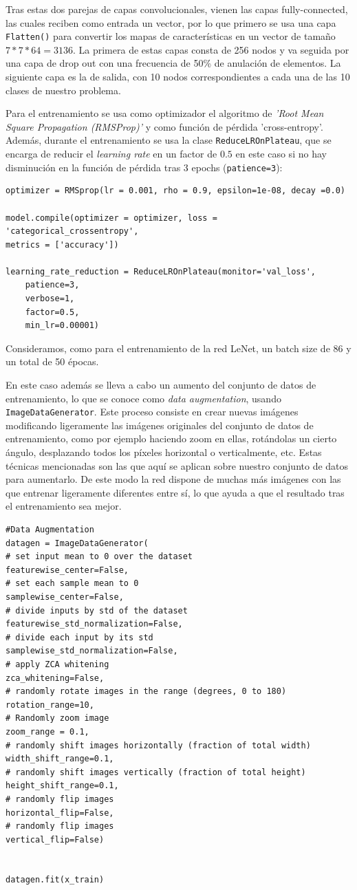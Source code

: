 \documentclass[a4paper,11pt]{article}
\begin{document}
Tras estas dos parejas de capas convolucionales, vienen las capas fully-connected, las cuales reciben como entrada un vector, por lo que primero se usa una capa \texttt{Flatten()} para convertir los mapas de características en un vector de tamaño $7*7*64=3136$.  La primera de estas capas consta de 256 nodos y va seguida por una capa de drop out con una frecuencia de 50\% de anulación de elementos. La siguiente capa es la de salida, con 10 nodos correspondientes a cada una de las 10 clases de nuestro problema. 

Para el entrenamiento se usa como optimizador el algoritmo de \textit{'Root Mean Square Propagation (RMSProp)'} y como función de pérdida 'cross-entropy'. Además, durante el entrenamiento se usa la clase \texttt{ReduceLROnPlateau}, que se encarga de reducir el \textit{learning rate} en un factor de $ 0.5$ en este caso si no hay disminución en la función de pérdida tras 3 epochs (\texttt{patience=3}):
\begin{verbatim}
optimizer = RMSprop(lr = 0.001, rho = 0.9, epsilon=1e-08, decay =0.0)

model.compile(optimizer = optimizer, loss = 'categorical_crossentropy', 
metrics = ['accuracy'])

learning_rate_reduction = ReduceLROnPlateau(monitor='val_loss', 
	patience=3, 
	verbose=1, 
	factor=0.5, 
	min_lr=0.00001)
\end{verbatim}

Consideramos, como para el entrenamiento de la red LeNet, un batch size de 86 y un total de 50 épocas. 

En este caso además se lleva a cabo un aumento del conjunto de datos de entrenamiento, lo que se conoce como \textit{data augmentation}, usando \texttt{ImageDataGenerator}. Este proceso consiste en crear nuevas imágenes modificando ligeramente las imágenes originales del conjunto de datos de entrenamiento, como por ejemplo haciendo zoom en ellas, rotándolas un cierto ángulo, desplazando todos los píxeles horizontal o verticalmente, etc. Estas técnicas mencionadas son las que  aquí se aplican sobre nuestro conjunto de datos para aumentarlo. De este modo la red dispone de muchas más imágenes con las que entrenar ligeramente diferentes entre sí, lo que ayuda a que el resultado tras el entrenamiento sea mejor. 
\begin{verbatim}
#Data Augmentation
datagen = ImageDataGenerator(
# set input mean to 0 over the dataset
featurewise_center=False, 
# set each sample mean to 0
samplewise_center=False, 
# divide inputs by std of the dataset
featurewise_std_normalization=False,  
# divide each input by its std
samplewise_std_normalization=False,  
# apply ZCA whitening
zca_whitening=False,  
# randomly rotate images in the range (degrees, 0 to 180)
rotation_range=10,  
# Randomly zoom image 
zoom_range = 0.1,
# randomly shift images horizontally (fraction of total width)
width_shift_range=0.1, 
# randomly shift images vertically (fraction of total height)
height_shift_range=0.1,  
# randomly flip images
horizontal_flip=False, 
# randomly flip images
vertical_flip=False) 


datagen.fit(x_train)
\end{verbatim}
\end{document}
